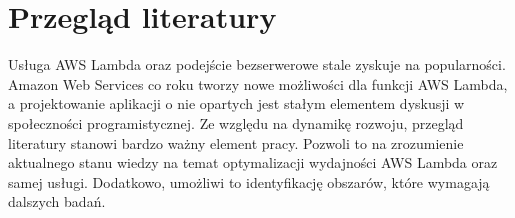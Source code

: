 \chapter{Przegląd literatury}\label{chapter:przeglad_literatury}

Usługa AWS Lambda oraz podejście bezserwerowe stale zyskuje na popularności.
Amazon Web Services co roku tworzy nowe możliwości dla funkcji AWS Lambda, a projektowanie aplikacji o nie opartych jest stałym elementem dyskusji w społeczności programistycznej.
Ze względu na dynamikę rozwoju, przegląd literatury stanowi bardzo ważny element pracy. 
Pozwoli to na zrozumienie aktualnego stanu wiedzy na temat optymalizacji wydajności AWS Lambda oraz samej usługi.
Dodatkowo, umożliwi to identyfikację obszarów, które wymagają dalszych badań.



